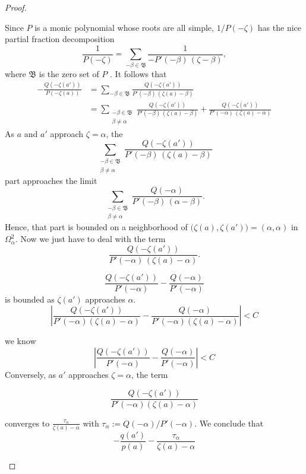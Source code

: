 \documentclass{article}
\theoremstyle{plain}
\newcommand{\roots}{\mathfrak{B}}
\newcommand{\domain}{\Omega}
\begin{document}
\begin{proof}
\begin{itemize}
Since $P$ is a monic polynomial whose roots are all simple, $1/P(-\zeta)$ has the nice partial fraction decomposition
\[ \frac{1}{P(-\zeta)} = \sum_{-\beta \in \roots} \frac{1}{-P'(-\beta)\,(\zeta - \beta)}, \]
where $\roots$ is the zero set of $P$ \cite[Section 1.4, Exercise~2]{ahlfors}. 
It follows that
\begin{align*}
-\frac{Q(-\zeta(a'))}{P(-\zeta(a))} & = \sum_{-\beta \in \roots} \frac{Q(-\zeta(a'))}{P'(-\beta)\,(\zeta(a) - \beta)} \\
& = \sum_{\substack{-\beta \in \roots \\ \beta \neq \alpha}} \frac{Q(-\zeta(a'))}{P'(-\beta)\,(\zeta(a) - \beta)} + \frac{Q(-\zeta(a'))}{P'(-\alpha)\,(\zeta(a) - \alpha)}
\end{align*}
As $a$ and $a'$ approach $\zeta = \alpha$, the
\[ \sum_{\substack{-\beta \in \roots \\ \beta \neq \alpha}} \frac{Q(-\zeta(a'))}{P'(-\beta)\,(\zeta(a) - \beta)} \]
part approaches the limit
\[ \sum_{\substack{-\beta \in \roots \\ \beta \neq \alpha}} \frac{Q(-\alpha)}{P'(-\beta)\,(\alpha - \beta)}. \]
Hence, that part is bounded on a neighborhood of $\big(\zeta(a), \zeta(a')\big) = (\alpha, \alpha)$ in $\domain_\alpha^2$. Now we just have to deal with the term
\[ \frac{Q(-\zeta(a'))}{P'(-\alpha)\,(\zeta(a)-\alpha)}. \]


\[ \frac{Q(-\zeta(a'))}{P'(-\alpha)}-\frac{Q(-\alpha)}{P'(-\alpha)}\]
is bounded as $\zeta(a')$ approaches $\alpha$.
\color{RoyalBlue}
\[ \left|\frac{Q(-\zeta(a'))}{P'(-\alpha)(\zeta(a)-\alpha)}-\frac{Q(-\alpha)}{P'(-\alpha)(\zeta(a)-\alpha)}\right|< C  \]

we know
\[ \left|\frac{Q(-\zeta(a'))}{P'(-\alpha)}-\frac{Q(-\alpha)}{P'(-\alpha)}\right|< C  \]
\color{black}
Conversely, as $a'$ approaches $\zeta=\alpha$, the term 

\[\frac{Q(-\zeta(a'))}{P'(-\alpha)(\zeta(a)-\alpha)}\]

converges to $\frac{\tau_\alpha}{\zeta(a)-\alpha}$ with $\tau_\alpha:=Q(-\alpha)/P'(-\alpha)$. We conclude that 
\[-\frac{q(a')}{p(a)}-\frac{\tau_\alpha}{\zeta(a)-\alpha}\]


\end{itemize}
\end{proof}
\end{document}
